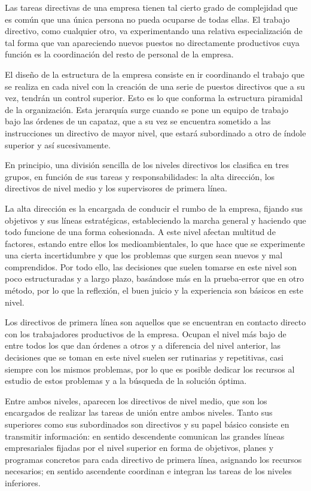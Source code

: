 \documentclass[
]{krantz}
\begin{document}
Las tareas directivas de una empresa tienen tal cierto grado de complejidad que es común que una única persona no pueda ocuparse de todas ellas. El trabajo directivo, como cualquier otro, va experimentando una relativa especialización de tal forma que van apareciendo nuevos puestos no directamente productivos cuya función es la coordinación del resto de personal de la empresa.

El diseño de la estructura de la empresa consiste en ir coordinando el trabajo que se realiza en cada nivel con la creación de una serie de puestos directivos que a su vez, tendrán un control superior. Esto es lo que conforma la estructura piramidal de la organización. Esta jerarquía surge cuando se pone un equipo de trabajo bajo las órdenes de un capataz, que a su vez se encuentra sometido a las instrucciones un directivo de mayor nivel, que estará subordinado a otro de índole superior y así sucesivamente.

En principio, una división sencilla de los niveles directivos los clasifica en tres grupos, en función de sus tareas y responsabilidades: la alta dirección, los directivos de nivel medio y los supervisores de primera línea.

La alta dirección es la encargada de conducir el rumbo de la empresa, fijando sus objetivos y sus líneas estratégicas, estableciendo la marcha general y haciendo que todo funcione de una forma cohesionada. A este nivel afectan multitud de factores, estando entre ellos los medioambientales, lo que hace que se experimente una cierta incertidumbre y que los problemas que surgen sean nuevos y mal comprendidos. Por todo ello, las decisiones que suelen tomarse en este nivel son poco estructuradas y a largo plazo, basándose más en la prueba-error que en otro método, por lo que la reflexión, el buen juicio y la experiencia son básicos en este nivel.

Los directivos de primera línea son aquellos que se encuentran en contacto directo con los trabajadores productivos de la empresa. Ocupan el nivel más bajo de entre todos los que dan órdenes a otros y a diferencia del nivel anterior, las decisiones que se toman en este nivel suelen ser rutinarias y repetitivas, casi siempre con los mismos problemas, por lo que es posible dedicar los recursos al estudio de estos problemas y a la búsqueda de la solución óptima.

Entre ambos niveles, aparecen los directivos de nivel medio, que son los encargados de realizar las tareas de unión entre ambos niveles. Tanto sus superiores como sus subordinados son directivos y su papel básico consiste en transmitir información: en sentido descendente comunican las grandes líneas empresariales fijadas por el nivel superior en forma de objetivos, planes y programas concretos para cada directivo de primera línea, asignando los recursos necesarios; en sentido ascendente coordinan e integran las tareas de los niveles inferiores.
\end{document}
